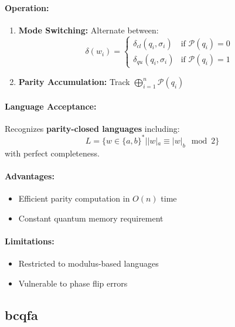 \paragraph{Operation:}
\begin{enumerate}
    \item \textbf{Mode Switching:} Alternate between:
    \[
    \delta(w_i) = \begin{cases}
        \delta_{cl}(q_i, \sigma_i) & \text{if } \mathcal{P}(q_i) = 0 \\
        \delta_{qu}(q_i, \sigma_i) & \text{if } \mathcal{P}(q_i) = 1
    \end{cases}
    \]
    \item \textbf{Parity Accumulation:} Track $\bigoplus_{i=1}^n \mathcal{P}(q_i)$
\end{enumerate}

\paragraph{Language Acceptance:}
Recognizes \textbf{parity-closed languages} including:
\[
L = \{w \in \{a,b\}^* | |w|_a \equiv |w|_b \mod 2\} 
\]
\cite{hirvensalo2012quantum}
with perfect completeness.

\paragraph{Advantages:}
\begin{itemize}
    \item Efficient parity computation in $O(n)$ time
    \item Constant quantum memory requirement
\end{itemize}

\paragraph{Limitations:}
\begin{itemize}
    \item Restricted to modulus-based languages
    \item Vulnerable to phase flip errors
\end{itemize}

\subsection{\acrfull{bcqfa}}
\label{subsec:bcqfa}

